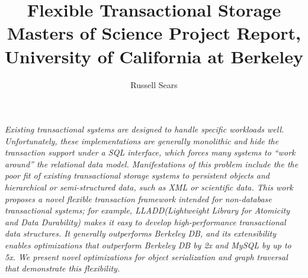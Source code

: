 \documentclass[10pt,letterpaper,twocolumn,english]{article}
\newcommand{\yad}{LLADD\xspace}
\begin{document}
\title{\vspace*{-36pt}Flexible Transactional Storage\\
\large{Masters of Science Project Report, University of California at Berkeley}}
\author{Russell Sears}
\maketitle



{\em Existing transactional systems are designed to handle specific
workloads well.  Unfortunately, these implementations are generally
monolithic and hide the transaction support under a SQL interface, which forces many systems to ``work around'' the relational data model.
Manifestations of this problem include the 
the poor fit of existing transactional storage systems to persistent
objects and hierarchical or semi-structured data, such as XML or
scientific data.  This work proposes a novel flexible transaction
framework intended for non-database transactional systems; for
example, \yad (Lightweight Library for Atomicity and Data Durability) makes it easy to develop high-performance transactional
data structures. It generally outperforms Berkeley DB, and its
extensibility enables optimizations that outperform Berkeley DB by 2x
and MySQL by up to 5x.  We present novel optimizations for object
serialization and graph traversal that demonstrate this flexibility.}

\end{document}
